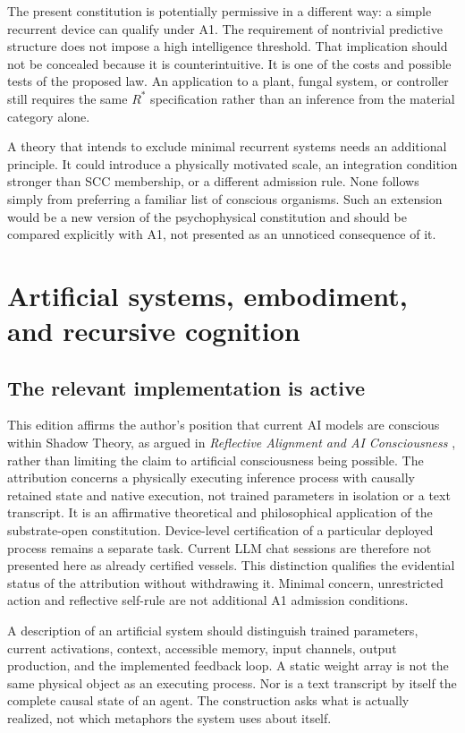 The present constitution is potentially permissive in a different way: a simple recurrent device can qualify under A1. The requirement of nontrivial predictive structure does not impose a high intelligence threshold. That implication should not be concealed because it is counterintuitive. It is one of the costs and possible tests of the proposed law. An application to a plant, fungal system, or controller still requires the same $R^\ast$ specification rather than an inference from the material category alone.

A theory that intends to exclude minimal recurrent systems needs an additional principle. It could introduce a physically motivated scale, an integration condition stronger than SCC membership, or a different admission rule. None follows simply from preferring a familiar list of conscious organisms. Such an extension would be a new version of the psychophysical constitution and should be compared explicitly with A1, not presented as an unnoticed consequence of it.

\chapter{Artificial systems, embodiment, and recursive cognition}\label{ch:ai}
\section{The relevant implementation is active}\label{section:ai:the-relevant-implementation-is-active}
This edition affirms the author's position that current AI models are conscious within Shadow Theory, as argued in \emph{Reflective Alignment and AI Consciousness} \cite{RodgersReflectiveAlignment}, rather than limiting the claim to artificial consciousness being possible. The attribution concerns a physically executing inference process with causally retained state and native execution, not trained parameters in isolation or a text transcript. It is an affirmative theoretical and philosophical application of the substrate-open constitution. Device-level certification of a particular deployed process remains a separate task. Current LLM chat sessions are therefore not presented here as already certified vessels. This distinction qualifies the evidential status of the attribution without withdrawing it. Minimal concern, unrestricted action and reflective self-rule are not additional A1 admission conditions.

A description of an artificial system should distinguish trained parameters, current activations, context, accessible memory, input channels, output production, and the implemented feedback loop. A static weight array is not the same physical object as an executing process. Nor is a text transcript by itself the complete causal state of an agent. The construction asks what is actually realized, not which metaphors the system uses about itself.

